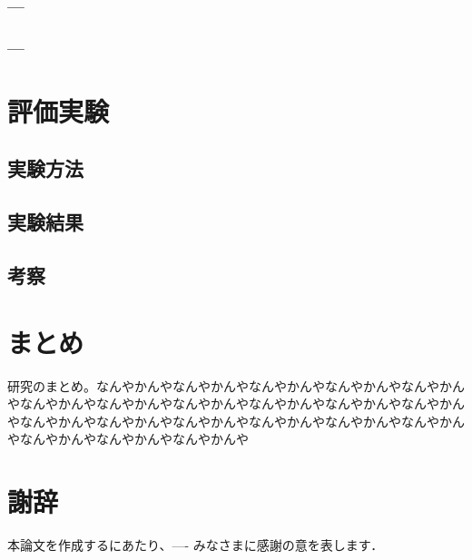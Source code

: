 \documentclass[11pt,a4j]{jreport}
\begin{document}
\subsection{---}
\subsection{---}

\chapter{評価実験}
\section{実験方法}
\section{実験結果}
\section{考察}

\chapter{まとめ}
研究のまとめ。なんやかんやなんやかんやなんやかんやなんやかんやなんやかんやなんやかんやなんやかんやなんやかんやなんやかんやなんやかんやなんやかんやなんやかんやなんやかんやなんやかんやなんやかんやなんやかんやなんやかんやなんやかんやなんやかんやなんやかんや

\chapter*{謝辞} %
本論文を作成するにあたり、---- みなさまに感謝の意を表します．


\renewcommand{\bibname}{参考文献} %
\end{document}
